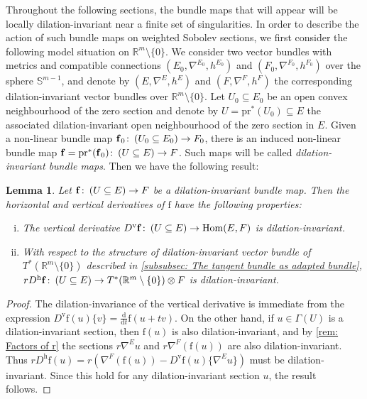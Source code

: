 \documentclass{article}
\numberwithin{equation}{section}        %
\theoremstyle{bfnote}
\newtheorem{lem}[thm]{Lemma}                %
\theoremstyle{definition}
\theoremstyle{bfremark}
\newcommand{\col}{\colon \thinspace}        %
\newcommand{\R}{\mathbb{R}}                 %
\newcommand{\Sp}{\mathbb{S}}                %
\newcommand{\pr}{\mathrm{pr}}               %
\newcommand{\diff}{\mathrm{d}}                      %
\newcommand{\bmap}[1]{\boldsymbol{\mathrm{#1}}}     %
\DeclareMathOperator{\Hom}{Hom}                 %
\begin{document}
Throughout the following sections, the bundle maps that will appear will be locally dilation-invariant near a finite set of singularities. In order to describe the action of such bundle maps on weighted Sobolev sections, we first consider the following model situation on $\R^m \setminus \{0\}$. We consider two vector bundles with metrics and compatible connections $(E_0,\nabla^{E_0},h^{E_0})$ and $(F_0, \nabla^{F_0},h^{F_0})$ over the sphere $\Sp^{m-1}$, and denote by $(E,\nabla^E,h^E)$ and $(F,\nabla^F,h^F)$ the corresponding dilation-invariant vector bundles over $\R^m \setminus \{0\}$. Let $U_0 \subseteq E_0$ be an open convex neighbourhood of the zero section and denote by $U = \pr^*(U_0) \subseteq E$ the associated dilation-invariant open neighbourhood of the zero section in $E$. Given a non-linear bundle map $\bmap{f}_0 \col (U_0 \subseteq E_0) \to F_0$, there is an induced non-linear bundle map $\bmap{f} = \pr^*(\bmap{f}_0) \col (U \subseteq E) \to F$. Such maps will be called \emph{dilation-invariant bundle maps}. Then we have the following result: 

\begin{lem}     \label{lem: Derivative of dilation-invariant bundle maps}
    Let $\bmap{f} \col (U \subseteq E) \to F$ be a dilation-invariant bundle map. Then the horizontal and vertical derivatives of $\bmap{f}$ have the following properties:
    \begin{enumerate}[(i)]
        \item The vertical derivative $D^{\mathrm{v}} \bmap{f} \col (U \subseteq E) \to \Hom(E,F)$ is dilation-invariant.
        \item With respect to the structure of dilation-invariant vector bundle of $T^*(\R^m \setminus \{0\})$ described in \cref{subsubsec: The tangent bundle as adapted bundle}, $r D^{\mathrm{h}} \bmap{f} \col (U \subseteq E) \to T^*(\R^m \setminus \{0\}) \otimes F$ is dilation-invariant.
    \end{enumerate}
\end{lem}

\begin{proof}
    The dilation-invariance of the vertical derivative is immediate from the expression $D^{\mathrm{v}} \bmap{f}(u)\{v\} = \frac{\diff}{\diff t} \bmap{f}(u+tv)$. On the other hand, if $u \in \Gamma(U)$ is a dilation-invariant section, then $\bmap{f}(u)$ is also dilation-invariant, and by \cref{rem: Factors of r} the sections $r \nabla^E u$ and $r\nabla^F (\bmap{f}(u))$ are also dilation-invariant. Thus $r D^{\mathrm{h}} \bmap{f}(u) = r(\nabla^F(\bmap{f}(u)) - D^{\mathrm{v}} \bmap{f}(u)\{\nabla^E u\})$ must be dilation-invariant. Since this hold for any dilation-invariant section $u$, the result follows.
\end{proof}
\end{document}
